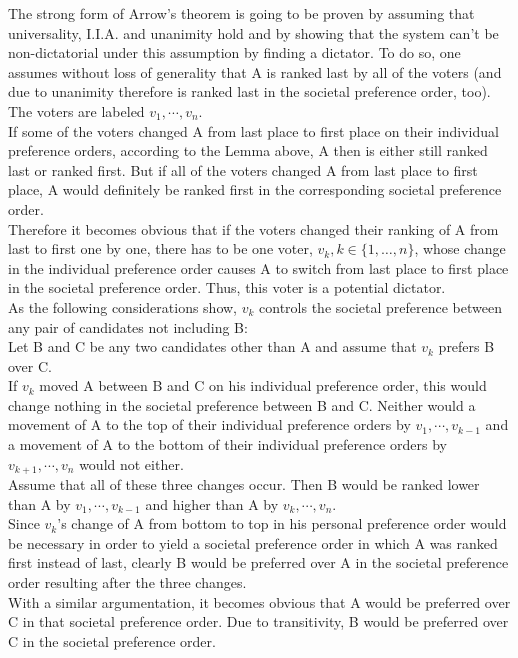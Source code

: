 The strong form of Arrow's theorem is going to be proven by assuming that universality, I.I.A. and unanimity hold and by showing that the system can't be non-dictatorial under this assumption by finding a dictator. To do so, one assumes without loss of generality that A is ranked last by all of the voters (and due to unanimity therefore is ranked last in the societal preference order, too). The voters are labeled $v_1, \cdots, v_n$. \\
If some of the voters changed A from last place to first place on their individual preference orders, according to the Lemma above, A then is either still ranked last or ranked first. But if all of the voters changed A from last place to first place, A would definitely be ranked first in the corresponding societal preference order. \\
Therefore it becomes obvious that if the voters changed their ranking of A from last to first one by one, there has to be one voter, $v_k, k \in \{1, \dotsc, n\}$, whose change in the individual preference order causes A to switch from last place to first place in the societal preference order. Thus, this voter is a potential dictator. \\
As the following considerations show, $v_k$ controls the societal preference between any pair of candidates not including B: \\ 
\noindent Let B and C be any two candidates other than A and assume that $v_k$ prefers B over C. \\ 
\noindent If $v_k$ moved A between B and C on his individual preference order, this would change nothing in the societal preference between B and C. Neither would a movement of A to the top of their individual preference orders by $v_1, \cdots, v_{k-1}$ and a movement of A to the bottom of their individual preference orders by $v_{k+1}, \cdots, v_n$ would not either. \\
Assume that all of these three changes occur. Then B would be ranked lower than A by $v_1, \cdots, v_{k-1}$ and higher than A by $v_{k}, \cdots, v_n$.\\ 
\noindent Since $v_k$'s change of A from bottom to top in his personal preference order would be necessary in order to yield a societal preference order in which A was ranked first instead of last, clearly B would be preferred over A in the societal preference order resulting after the three changes. \\
\noindent With a similar argumentation, it becomes obvious that A would be preferred over C in that societal preference order. Due to transitivity, B would be preferred over C in the societal preference order. \\
